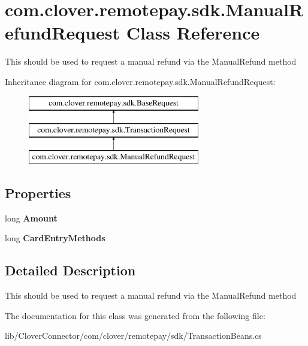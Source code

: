 \hypertarget{classcom_1_1clover_1_1remotepay_1_1sdk_1_1_manual_refund_request}{}\section{com.\+clover.\+remotepay.\+sdk.\+Manual\+Refund\+Request Class Reference}
\label{classcom_1_1clover_1_1remotepay_1_1sdk_1_1_manual_refund_request}


This should be used to request a manual refund via the Manual\+Refund method  


Inheritance diagram for com.\+clover.\+remotepay.\+sdk.\+Manual\+Refund\+Request\+:\begin{figure}[H]
\begin{center}
\leavevmode
\includegraphics[height=3.000000cm]{classcom_1_1clover_1_1remotepay_1_1sdk_1_1_manual_refund_request}
\end{center}
\end{figure}
\subsection*{Properties}
\begin{DoxyCompactItemize}
\item 
\mbox{\label{classcom_1_1clover_1_1remotepay_1_1sdk_1_1_manual_refund_request_aec10ad5d6babdfb26e091c0e23de44a6}} 
long {\bfseries Amount}
\item 
\mbox{\label{classcom_1_1clover_1_1remotepay_1_1sdk_1_1_manual_refund_request_a9e34fc487579d6f6b68b0e3017e9a829}} 
long {\bfseries Card\+Entry\+Methods}
\end{DoxyCompactItemize}


\subsection{Detailed Description}
This should be used to request a manual refund via the Manual\+Refund method 



The documentation for this class was generated from the following file\+:\begin{DoxyCompactItemize}
\item 
lib/\+Clover\+Connector/com/clover/remotepay/sdk/Transaction\+Beans.\+cs\end{DoxyCompactItemize}
